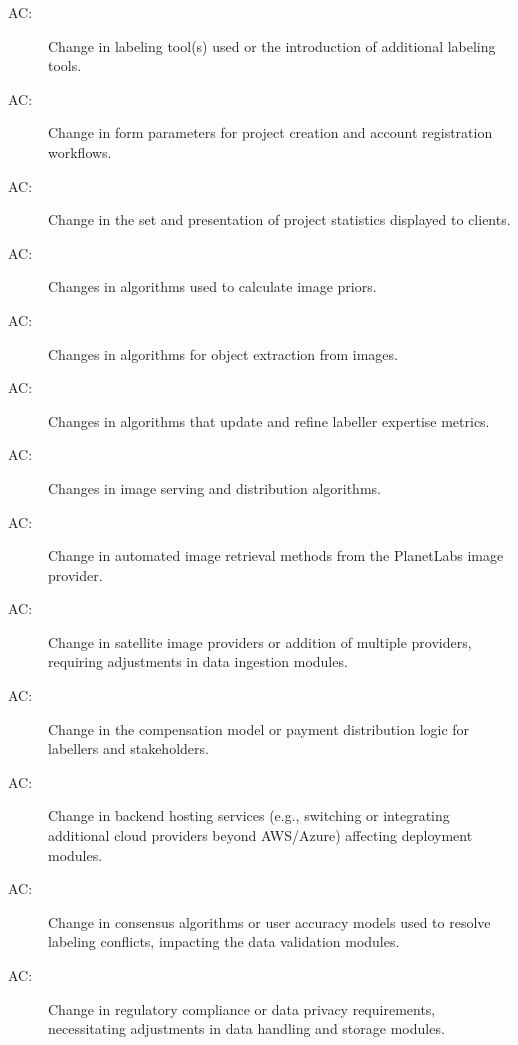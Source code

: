 \documentclass[12pt, titlepage]{article}
\newcounter{acnum}
\newcommand{\actheacnum}{AC\theacnum}
\begin{document}
\begin{description}
\item[ \actheacnum \label{acHardware}:] Change in labeling tool(s) used or the introduction of additional labeling tools.
\item[ \actheacnum \label{acInput}:] Change in form parameters for project creation and account registration workflows.
\item[ \actheacnum \label{acPresentation}:] Change in the set and presentation of project statistics displayed to clients.
\item[ \actheacnum \label{acImagePriors}:] Changes in algorithms used to calculate image priors.
\item[ \actheacnum \label{acObjectExtr}:] Changes in algorithms for object extraction from images.
\item[ \actheacnum \label{acExpertLabel}:] Changes in algorithms that update and refine labeller expertise metrics.
\item[ \actheacnum \label{acImageServe}:] Changes in image serving and distribution algorithms.
\item[ \actheacnum \label{acPlanetLabs}:] Change in automated image retrieval methods from the PlanetLabs image provider.
\item[ \actheacnum \label{acImageProvider}:] Change in satellite image providers or addition of multiple providers, requiring adjustments in data ingestion modules.
\item[ \actheacnum \label{acMoneyModel}:] Change in the compensation model or payment distribution logic for labellers and stakeholders.
\item[ \actheacnum \label{acCloud}:] Change in backend hosting services (e.g., switching or integrating additional cloud providers beyond AWS/Azure) affecting deployment modules.
\item[ \actheacnum \label{acConsensus}:] Change in consensus algorithms or user accuracy models used to resolve labeling conflicts, impacting the data validation modules.
\item[ \actheacnum \label{acLegal}:] Change in regulatory compliance or data privacy requirements, necessitating adjustments in data handling and storage modules.
\end{description}
\end{document}

